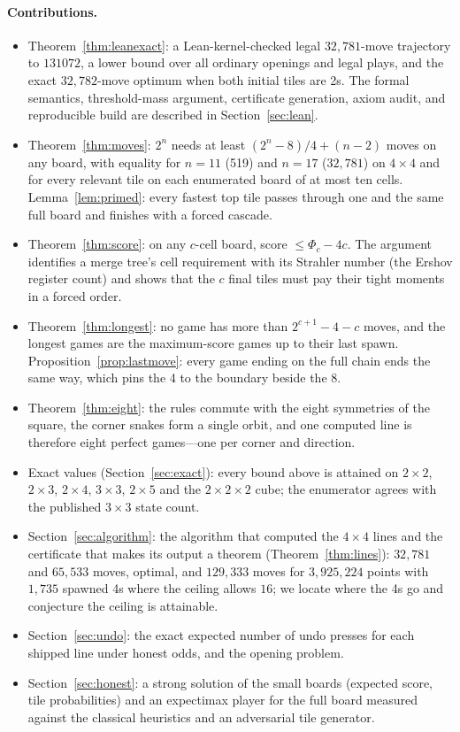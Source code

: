 \documentclass[11pt]{article}
\theoremstyle{definition}
\theoremstyle{remark}
\begin{document}
\paragraph{Contributions.}
\begin{itemize}[nosep]
\item Theorem~\ref{thm:leanexact}: a Lean-kernel-checked legal
$32{,}781$-move trajectory to $131072$, a lower bound over all ordinary
openings and legal plays, and the exact $32{,}782$-move optimum when
both initial tiles are 2s. The formal semantics, threshold-mass argument,
certificate generation, axiom audit, and reproducible build are described
in Section~\ref{sec:lean}.
\item Theorem~\ref{thm:moves}: $2^n$ needs at least $(2^n-8)/4+(n-2)$
moves on any board, with equality for $n=11$ (519) and $n=17$
($32{,}781$) on $4\times4$ and for every relevant tile on each enumerated board of at most
ten cells. Lemma~\ref{lem:primed}: every fastest top tile passes through
one and the same full board and finishes with a forced cascade.
\item Theorem~\ref{thm:score}: on any $c$-cell board, score $\le\Phi_c-4c$.
The argument identifies a merge tree's cell requirement with its Strahler
number (the Ershov register count) and shows that the $c$ final tiles must
pay their tight moments in a forced order.
\item Theorem~\ref{thm:longest}: no game has more than $2^{c+1}-4-c$
moves, and the longest games are the maximum-score games up to their last
spawn. Proposition~\ref{prop:lastmove}: every game ending on the full
chain ends the same way, which pins the 4 to the boundary beside the 8.
\item Theorem~\ref{thm:eight}: the rules commute with the eight symmetries
of the square, the corner snakes form a single orbit, and one computed
line is therefore eight perfect games---one per corner and direction.
\item Exact values (Section~\ref{sec:exact}): every bound above is
attained on $2\times2$, $2\times3$, $2\times4$, $3\times3$, $2\times5$
and the $2\times2\times2$ cube; the enumerator agrees with the published
$3\times3$ state count.
\item Section~\ref{sec:algorithm}: the algorithm that computed the
$4\times4$ lines and the certificate that makes its output a theorem
(Theorem~\ref{thm:lines}): $32{,}781$ and $65{,}533$ moves, optimal, and
$129{,}333$ moves for $3{,}925{,}224$ points with $1{,}735$ spawned 4s
where the ceiling allows $16$; we locate where the 4s go and conjecture
the ceiling is attainable.
\item Section~\ref{sec:undo}: the exact expected number of undo presses
for each shipped line under honest odds, and the opening problem.
\item Section~\ref{sec:honest}: a strong solution of the small boards
(expected score, tile probabilities) and an expectimax player for the
full board measured against the classical heuristics and an adversarial
tile generator.
\end{itemize}
\end{document}
